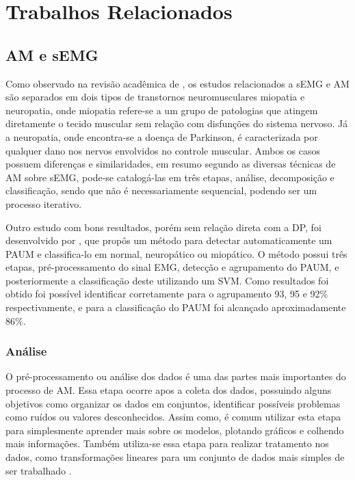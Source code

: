 \chapter{Trabalhos Relacionados}
\label{ch:TrabalhosRelacionados}

\section{AM e sEMG}
Como observado na revisão acadêmica de \cite{yousefi2014characterizing}, os estudos relacionados a sEMG e AM são separados em  dois tipos de transtornos neuromusculares miopatia e neuropatia, onde miopatia refere-se a um grupo de patologias que atingem diretamente o tecido muscular sem relação com disfunções do sistema nervoso. Já a neuropatia, onde encontra-se a doença de Parkinson, é caracterizada por qualquer dano nos nervos envolvidos no controle muscular. Ambos os casos possuem diferenças e similaridades, em resumo segundo \cite{yousefi2014characterizing} as diversas técnicas de AM sobre sEMG, pode-se catalogá-las em três etapas, análise, decomposição e classificação, sendo que não é necessariamente sequencial, podendo ser um processo iterativo.

Outro estudo com bons resultados, porém sem relação direta com a DP, foi desenvolvido por \cite{katsis2006novel}, que propôs um método para detectar automaticamente um PAUM e classifica-lo em normal, neuropático ou miopático. O método possui três etapas, pré-processamento do sinal EMG, detecção e agrupamento do PAUM, e posteriormente a classificação deste utilizando um SVM. Como resultados foi obtido foi possível identificar corretamente para o agrupamento 93, 95 e 92\% respectivamente, e para a classificação do PAUM foi alcançado aproximadamente 86\%. 

\subsection{Análise}
O pré-processamento ou análise dos dados é uma das partes mais importantes do processo de AM. Essa etapa ocorre apos a coleta dos dados, possuindo alguns objetivos como organizar os dados em conjuntos, identificar possíveis problemas como ruídos ou valores desconhecidos. Assim como, é comum utilizar esta etapa para simplesmente aprender mais sobre os modelos, plotando gráficos e colhendo mais informações. Também utiliza-se essa etapa para realizar tratamento nos dados, como transformações lineares para um conjunto de dados mais simples de ser trabalhado \cite{batista2003pre}. 

